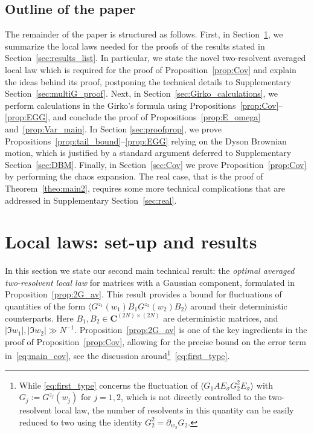 \documentclass[10pt]{amsart}
\numberwithin{equation}{section}
\newcommand{\C}{\mathbf{C}}
\begin{document}
\subsection*{Outline of the paper} The remainder of the paper is structured as follows. First, in Section~\ref{sec:local_laws}, we summarize the local laws needed for the proofs of the results stated in Section~\ref{sec:results_list}. In particular, we state the novel two-resolvent averaged local law which is required for the proof of Proposition~\ref{prop:Cov} and explain the ideas behind its proof, postponing the technical details to Supplementary Section~\ref{sec:multiG_proof}. Next, in Section~\ref{sec:Girko_calculations}, we perform calculations in the Girko's formula using Propositions~\ref{prop:Cov}--\ref{prop:EGG}, and conclude the proof of Propositions~\ref{prop:E_omega} and~\ref{prop:Var_main}. In Section \ref{sec:proofprop}, we prove Propositions~\ref{prop:tail_bound}--\ref{prop:EGG} relying on the Dyson Brownian motion, which is justified by a standard argument deferred to Supplementary Section~\ref{sec:DBM}. Finally, in Section~\ref{sec:Cov} we prove Proposition~\ref{prop:Cov} by performing the chaos expansion. The real case, that is the proof of Theorem~\ref{theo:main2}, requires some more technical complications that are addressed in Supplementary Section~\ref{sec:real}.



\section{Local laws: set-up and results}\label{sec:local_laws}

In this section we state our second main technical result: the \emph{optimal averaged two-resolvent local law} for matrices with a Gaussian component, formulated in Proposition~\ref{prop:2G_av}. This result provides a bound for fluctuations of quantities of the form $\langle G^{z_1}(w_1)B_1G^{z_2}(w_2)B_2\rangle$ around their deterministic counterparts. Here $B_1, B_2\in \C^{(2N)\times (2N)}$ are deterministic matrices, and $|\Im w_1|, |\Im w_2|\gg N^{-1}$. Proposition~\ref{prop:2G_av} is one of the key ingredients in the proof of Proposition~\ref{prop:Cov}, allowing for the precise bound on the error term in~\eqref{eq:main_cov}, see the discussion around\footnote{\label{ftn:GG}While \eqref{eq:first_type} concerns the fluctuation of $\langle G_1AE_\sigma G_2^2E_\sigma\rangle$ with $G_j:=G^{z_j}(w_j)$ for $j=1,2$, which is not directly controlled to the two-resolvent local law, the number of resolvents in this quantity can be easily reduced to two using the identity $G_2^2 = \partial_{w_2} G_2$.}~\eqref{eq:first_type}. 
\end{document}
